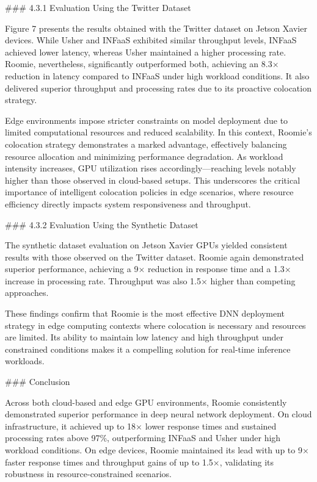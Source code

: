 ### 4.3.1 Evaluation Using the Twitter Dataset

Figure 7 presents the results obtained with the Twitter dataset on Jetson Xavier devices. While Usher and INFaaS exhibited similar throughput levels, INFaaS achieved lower latency, whereas Usher maintained a higher processing rate. Roomie, nevertheless, significantly outperformed both, achieving an 8.3× reduction in latency compared to INFaaS under high workload conditions. It also delivered superior throughput and processing rates due to its proactive colocation strategy.

Edge environments impose stricter constraints on model deployment due to limited computational resources and reduced scalability. In this context, Roomie’s colocation strategy demonstrates a marked advantage, effectively balancing resource allocation and minimizing performance degradation. As workload intensity increases, GPU utilization rises accordingly—reaching levels notably higher than those observed in cloud-based setups. This underscores the critical importance of intelligent colocation policies in edge scenarios, where resource efficiency directly impacts system responsiveness and throughput.

### 4.3.2 Evaluation Using the Synthetic Dataset

The synthetic dataset evaluation on Jetson Xavier GPUs yielded consistent results with those observed on the Twitter dataset. Roomie again demonstrated superior performance, achieving a 9× reduction in response time and a 1.3× increase in processing rate. Throughput was also 1.5× higher than competing approaches.

These findings confirm that Roomie is the most effective DNN deployment strategy in edge computing contexts where colocation is necessary and resources are limited. Its ability to maintain low latency and high throughput under constrained conditions makes it a compelling solution for real-time inference workloads.


### Conclusion

Across both cloud-based and edge GPU environments, Roomie consistently demonstrated superior performance in deep neural network deployment. On cloud infrastructure, it achieved up to 18× lower response times and sustained processing rates above 97\%, outperforming INFaaS and Usher under high workload conditions. On edge devices, Roomie maintained its lead with up to 9× faster response times and throughput gains of up to 1.5×, validating its robustness in resource-constrained scenarios.

